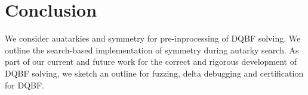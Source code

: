 \documentclass[conference]{IEEEtran}
\begin{document}
\section{Conclusion}
\label{sec:conc}

We consider auatarkies and symmetry for pre-inprocessing of DQBF solving.
%
We outline the search-based implementation of symmetry during autarky search.
%
As part of our current and future work for the correct and rigorous development of DQBF solving, we sketch an outline for fuzzing, delta debugging and certification for DQBF.


%
%


\end{document}

